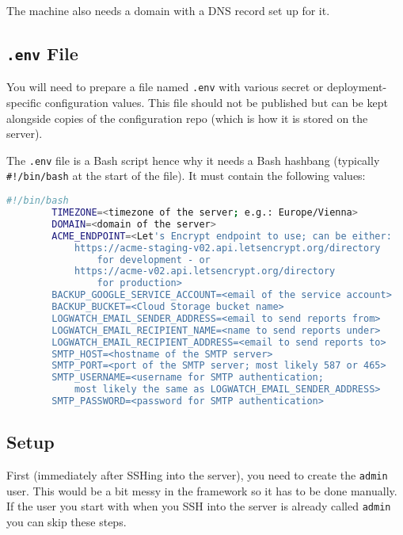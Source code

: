\documentclass[12pt,a4paper]{report}
\begin{document}
	The machine also needs a domain with a DNS record set up for it.

	\subsection{\lstinline|.env| File}
	You will need to prepare a file named \lstinline|.env| with various secret or deployment-specific configuration values. This file should not be published but can be kept alongside copies of the configuration repo (which is how it is stored on the server).

	The \lstinline|.env| file is a Bash script hence why it needs a Bash hashbang (typically \lstinline|#!/bin/bash| at the start of the file). It must contain the following values:

	\begin{lstlisting}[language=bash]
		#!/bin/bash
		TIMEZONE=<timezone of the server; e.g.: Europe/Vienna>
		DOMAIN=<domain of the server>
		ACME_ENDPOINT=<Let's Encrypt endpoint to use; can be either:
		    https://acme-staging-v02.api.letsencrypt.org/directory
		        for development - or
		    https://acme-v02.api.letsencrypt.org/directory
		        for production>
		BACKUP_GOOGLE_SERVICE_ACCOUNT=<email of the service account>
		BACKUP_BUCKET=<Cloud Storage bucket name>
		LOGWATCH_EMAIL_SENDER_ADDRESS=<email to send reports from>
		LOGWATCH_EMAIL_RECIPIENT_NAME=<name to send reports under>
		LOGWATCH_EMAIL_RECIPIENT_ADDRESS=<email to send reports to>
		SMTP_HOST=<hostname of the SMTP server>
		SMTP_PORT=<port of the SMTP server; most likely 587 or 465>
		SMTP_USERNAME=<username for SMTP authentication;
		    most likely the same as LOGWATCH_EMAIL_SENDER_ADDRESS>
		SMTP_PASSWORD=<password for SMTP authentication>
	\end{lstlisting}

	\subsection{Setup}
	First (immediately after SSHing into the server), you need to create the \lstinline|admin| user. This would be a bit messy in the framework so it has to be done manually. If the user you start with when you SSH into the server is already called \lstinline|admin| you can skip these steps.
\end{document}
